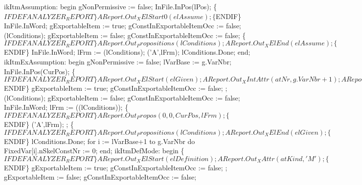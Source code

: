       ikItmAssumption:
         begin
            gNonPermissive := false;
            InFile.InPos(lPos);
            \{$IFDEF ANALYZER_REPORT\}
            AReport.Out_XElStart0(elAssume);
            \{$ENDIF\}
            InFile.InWord;
            gExportableItem := true;
            gConstInExportableItemOcc := false;
            (lConditions);
            gExportableItem := false;
            gConstInExportableItemOcc := false;
            \{$IFDEF ANALYZER_REPORT\}
            AReport.Out_Propositions(lConditions);
            AReport.Out_XElEnd(elAssume);
            \{$ENDIF\}
            InFile.InWord;
            lFrm := (lConditions);
            ('A',lFrm);
            lConditions.Done;
         end;
      ikItmExAssumption:
         begin
            gNonPermissive := false;
            lVarBase := g.VarNbr;
            InFile.InPos(CurPos);
            \{$IFDEF ANALYZER_REPORT\}
            AReport.Out_XElStart(elGiven);
            AReport.Out_XIntAttr(atNr, g.VarNbr+1);
            AReport.Out_XAttrEnd;
            \{$ENDIF\}
            gExportableItem := true;
            gConstInExportableItemOcc := false;
            ;
            (lConditions);
            gExportableItem := false;
            gConstInExportableItemOcc := false;
            InFile.InWord;
            lFrm := ((lConditions));
            \{$IFDEF ANALYZER_REPORT\}
            AReport.Out_Propos(0, 0, CurPos, lFrm);
            \{$ENDIF\}
            ('A',lFrm);
            ;
            \{$IFDEF ANALYZER_REPORT\}
            AReport.Out_Propositions(lConditions);
            AReport.Out_XElEnd(elGiven);
            \{$ENDIF\}
            lConditions.Done;
            for i := lVarBase+1 to g.VarNbr do FixedVar[i].nSkelConstNr := 0;
         end;
      ikItmDefMode:
         begin
            \{$IFDEF ANALYZER_REPORT\}
            AReport.Out_XElStart(elDefinition);
            AReport.Out_XAttr(atKind, 'M');
            \{$ENDIF\}
            gExportableItem := true;
            gConstInExportableItemOcc := false;
            ;
            gExportableItem := false;
            gConstInExportableItemOcc := false;
